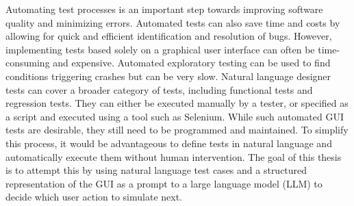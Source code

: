 
\Abstract
Automating test processes is an important step towards improving software quality and minimizing errors. Automated tests can also save time and costs by allowing for quick and efficient identification and resolution of bugs. However, implementing tests based solely on a graphical user interface can often be time-consuming and expensive. Automated exploratory testing can be used to find conditions triggering crashes but can be very slow. Natural language designer tests can cover a broader category of tests, including functional tests and regression tests. They can either be executed manually by a tester, or specified as a script and executed using a tool such as Selenium. While such automated GUI tests are desirable, they still need to be programmed and maintained. 
To simplify this process, it would be advantageous to define tests in natural language and automatically execute them without human intervention. The goal of this thesis is to attempt this by using natural language test cases and a structured representation of the GUI as a prompt to a large language model (LLM) to decide which user action to simulate next.
